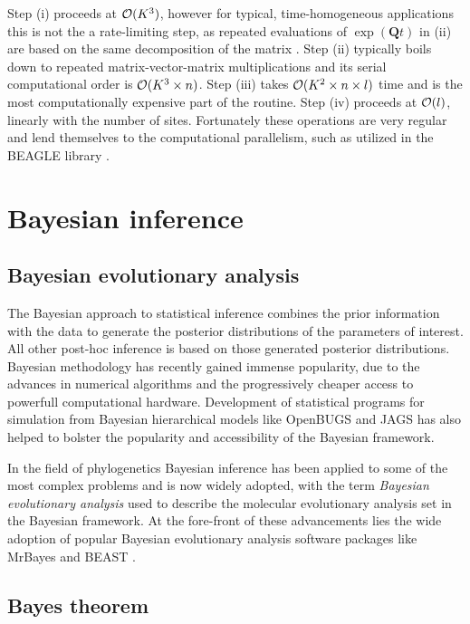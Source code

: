 Step (i) proceeds at ${\cal{O}}(K^3)$, however for typical, time-homogeneous applications this is not the a rate-limiting step, as repeated evaluations of $\exp(\mathbf{Q}t)$ in (ii) are based on the same decomposition of the matrix \citep{Suchard2009}. 
Step (ii) typically boils down to repeated matrix-vector-matrix multiplications and its serial computational order is ${\cal{O}}(K^3 \times n)$. 
Step (iii) takes ${\cal{O}}(K^2 \times n \times l)$ time and is the most computationally expensive part of the routine. 
Step (iv) proceeds at ${\cal{O}}(l)$, linearly with the number of sites.
Fortunately these operations are very regular and lend themselves to the computational parallelism, such as utilized in the BEAGLE library \citep{Suchard2009,Ayres2012}.


\section{Bayesian inference}

\subsection{Bayesian evolutionary analysis}

The Bayesian approach to statistical inference combines the prior information with the data to generate the posterior distributions of the parameters of interest.
All other post-hoc inference is based on those generated posterior distributions.
Bayesian methodology has recently gained immense popularity, due to the advances in numerical algorithms and the progressively cheaper access to powerfull computational hardware.
Development of statistical programs for simulation from Bayesian hierarchical models like OpenBUGS \citep{Lunn2009} and JAGS \citep{Plummer2003} has also helped to bolster the popularity and accessibility of the Bayesian framework.

In the field of phylogenetics Bayesian inference has been applied to some of the most complex problems and is now widely adopted, with the term \emph{Bayesian evolutionary analysis} used to describe the molecular evolutionary analysis set in the Bayesian framework.
At the fore-front of these advancements lies the wide adoption of popular Bayesian evolutionary analysis software packages like MrBayes \citep{Ronquist2012} and BEAST \citep{Drummond2012}.

\subsection{Bayes theorem\label{sub:bayesTheorem}}

